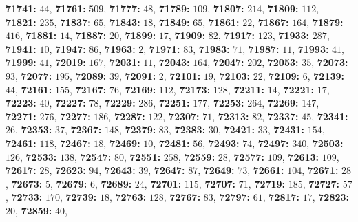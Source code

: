 \textsf{\bfseries 71741:} $44$, \textsf{\bfseries 71761:} $509$, \textsf{\bfseries 71777:} $48$, \textsf{\bfseries 71789:} $109$, \textsf{\bfseries 71807:} $214$, \textsf{\bfseries 71809:} $112$, \textsf{\bfseries 71821:} $235$, \textsf{\bfseries 71837:} $65$, \textsf{\bfseries 71843:} $18$, \textsf{\bfseries 71849:} $65$, \textsf{\bfseries 71861:} $22$, \textsf{\bfseries 71867:} $164$, \textsf{\bfseries 71879:} $416$, \textsf{\bfseries 71881:} $14$, \textsf{\bfseries 71887:} $20$, \textsf{\bfseries 71899:} $17$, \textsf{\bfseries 71909:} $82$, \textsf{\bfseries 71917:} $123$, \textsf{\bfseries 71933:} $287$, \textsf{\bfseries 71941:} $10$, \textsf{\bfseries 71947:} $86$, \textsf{\bfseries 71963:} $2$, \textsf{\bfseries 71971:} $83$, \textsf{\bfseries 71983:} $71$, \textsf{\bfseries 71987:} $11$, \textsf{\bfseries 71993:} $41$, \textsf{\bfseries 71999:} $41$, \textsf{\bfseries 72019:} $167$, \textsf{\bfseries 72031:} $11$, \textsf{\bfseries 72043:} $164$, \textsf{\bfseries 72047:} $202$, \textsf{\bfseries 72053:} $35$, \textsf{\bfseries 72073:} $93$, \textsf{\bfseries 72077:} $195$, \textsf{\bfseries 72089:} $39$, \textsf{\bfseries 72091:} $2$, \textsf{\bfseries 72101:} $19$, \textsf{\bfseries 72103:} $22$, \textsf{\bfseries 72109:} $6$, \textsf{\bfseries 72139:} $44$, \textsf{\bfseries 72161:} $155$, \textsf{\bfseries 72167:} $76$, \textsf{\bfseries 72169:} $112$, \textsf{\bfseries 72173:} $128$, \textsf{\bfseries 72211:} $14$, \textsf{\bfseries 72221:} $17$, \textsf{\bfseries 72223:} $40$, \textsf{\bfseries 72227:} $78$, \textsf{\bfseries 72229:} $286$, \textsf{\bfseries 72251:} $177$, \textsf{\bfseries 72253:} $264$, \textsf{\bfseries 72269:} $147$, \textsf{\bfseries 72271:} $276$, \textsf{\bfseries 72277:} $186$, \textsf{\bfseries 72287:} $122$, \textsf{\bfseries 72307:} $71$, \textsf{\bfseries 72313:} $82$, \textsf{\bfseries 72337:} $45$, \textsf{\bfseries 72341:} $26$, \textsf{\bfseries 72353:} $37$, \textsf{\bfseries 72367:} $148$, \textsf{\bfseries 72379:} $83$, \textsf{\bfseries 72383:} $30$, \textsf{\bfseries 72421:} $33$, \textsf{\bfseries 72431:} $154$, \textsf{\bfseries 72461:} $118$, \textsf{\bfseries 72467:} $18$, \textsf{\bfseries 72469:} $10$, \textsf{\bfseries 72481:} $56$, \textsf{\bfseries 72493:} $74$, \textsf{\bfseries 72497:} $340$, \textsf{\bfseries 72503:} $126$, \textsf{\bfseries 72533:} $138$, \textsf{\bfseries 72547:} $80$, \textsf{\bfseries 72551:} $258$, \textsf{\bfseries 72559:} $28$, \textsf{\bfseries 72577:} $109$, \textsf{\bfseries 72613:} $109$, \textsf{\bfseries 72617:} $28$, \textsf{\bfseries 72623:} $94$, \textsf{\bfseries 72643:} $39$, \textsf{\bfseries 72647:} $87$, \textsf{\bfseries 72649:} $73$, \textsf{\bfseries 72661:} $104$, \textsf{\bfseries 72671:} $28$, \textsf{\bfseries 72673:} $5$, \textsf{\bfseries 72679:} $6$, \textsf{\bfseries 72689:} $24$, \textsf{\bfseries 72701:} $115$, \textsf{\bfseries 72707:} $71$, \textsf{\bfseries 72719:} $185$, \textsf{\bfseries 72727:} $57$, \textsf{\bfseries 72733:} $170$, \textsf{\bfseries 72739:} $18$, \textsf{\bfseries 72763:} $128$, \textsf{\bfseries 72767:} $83$, \textsf{\bfseries 72797:} $61$, \textsf{\bfseries 72817:} $17$, \textsf{\bfseries 72823:} $20$, \textsf{\bfseries 72859:} $40$, 
